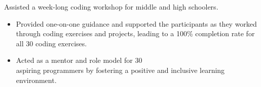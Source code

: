 

Assisted a week-long coding workshop for middle and high schoolers.
\begin{itemize}
\item 
Provided one-on-one guidance and supported the participants as they worked through coding exercises and projects, leading to a 100\% completion rate for all 30 coding exercises.
\item 
Acted as a mentor and role model for 30 \\ aspiring programmers by fostering a positive and inclusive learning environment.
\end{itemize}
